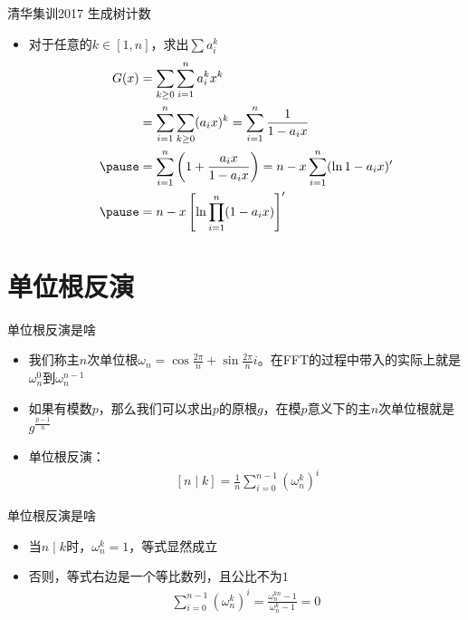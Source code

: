 \documentclass{beamer}
\begin{document}
\begin{frame}{清华集训2017 生成树计数}
    \begin{itemize}
        \item 对于任意的$k\in [1, n]$，求出$\sum a_i^k$ \pause
        $$\begin{aligned}
            G(x) &= \sum_{k\geq 0} \sum_{i = 1}^n a_i^kx^k\\
            &= \sum_{i = 1}^n \sum_{k\geq 0} (a_ix)^k = \sum_{i = 1}^n \frac{1}{1 - a_ix}\\ \pause
            &= \sum_{i = 1}^n \left(1 + \frac{a_ix}{1 - a_ix}\right) = n - x\sum_{i = 1}^n (\ln 1 - a_ix)'\\ \pause
            &= n - x\left[\ln \prod_{i = 1}^n (1 - a_ix)\right]'
        \end{aligned}$$
    \end{itemize}
\end{frame}

\section{单位根反演}

\begin{frame}{单位根反演是啥}
    \begin{itemize}
        \item 我们称主$n$次单位根$\omega_n = \cos \frac{2\pi}{n} + \sin \frac{2\pi}{n}i$。在FFT的过程中带入的实际上就是$\omega_n^0$到$\omega_n^{n - 1}$ \pause
        \item 如果有模数$p$，那么我们可以求出$p$的原根$g$，在模$p$意义下的主$n$次单位根就是$g^{\frac{p - 1}{n}}$ \pause
        \item 单位根反演：
        $$\begin{aligned}
            \ [n\mid k] = \frac{1}{n} \sum_{i = 0}^{n - 1} (\omega_n^k)^i
        \end{aligned}$$
    \end{itemize}
\end{frame}

\begin{frame}{单位根反演是啥}
    \begin{itemize}
        \item 当$n\mid k$时，$\omega_n^k = 1$，等式显然成立 \pause
        \item 否则，等式右边是一个等比数列，且公比不为$1$ \pause
        $$\begin{aligned}
            \sum_{i = 0}^{n - 1} (\omega_n^k)^i = \frac{\omega_n^{kn} - 1}{\omega_n^k - 1} = 0
        \end{aligned}$$
    \end{itemize}
\end{frame}
\end{document}
